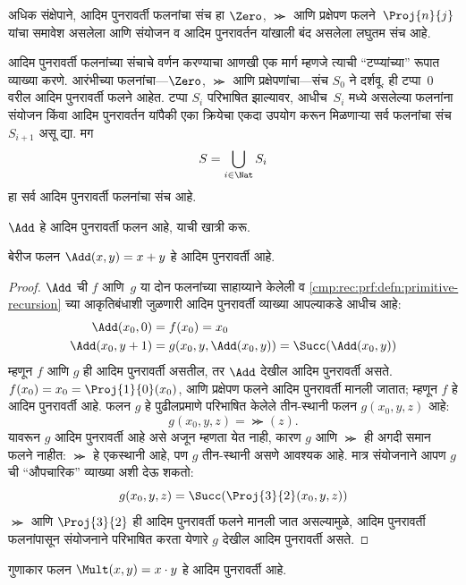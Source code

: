 \begin{explain}
अधिक संक्षेपाने, आदिम पुनरावर्ती फलनांचा संच हा $\Zero$, $\Succ$ आणि
प्रक्षेपण फलने~$\Proj{n}{j}$ यांचा समावेश असलेला आणि संयोजन व आदिम
पुनरावर्तन यांखाली बंद असलेला लघुतम संच आहे.

आदिम पुनरावर्ती फलनांच्या संचाचे वर्णन करण्याचा आणखी एक मार्ग म्हणजे
त्याची ``टप्प्यांच्या'' रूपात व्याख्या करणे. आरंभीच्या फलनांचा---$\Zero$,
$\Succ$ आणि प्रक्षेपणांचा---संच $S_0$ ने दर्शवू. ही टप्पा~$0$ वरील
आदिम पुनरावर्ती फलने आहेत. टप्पा $S_i$ परिभाषित झाल्यावर, आधीच~$S_i$
मध्ये असलेल्या फलनांना संयोजन किंवा आदिम पुनरावर्तन यांपैकी एका क्रियेचा
एकदा उपयोग करून मिळणाऱ्या सर्व फलनांचा संच $S_{i+1}$ असू द्या. मग
\[S = \bigcup_{i \in \Nat} S_i
\]
हा सर्व आदिम पुनरावर्ती फलनांचा संच आहे.
\end{explain}

$\Add$ हे आदिम पुनरावर्ती फलन आहे, याची खात्री करू.

\begin{prop}
  बेरीज फलन $\Add(x,y) = x+y$ हे आदिम पुनरावर्ती आहे.
\end{prop}

\begin{proof}
$\Add$ ची $f$ आणि~$g$ या दोन फलनांच्या साहाय्याने केलेली व
\ref{cmp:rec:prf:defn:primitive-recursion} च्या आकृतिबंधाशी जुळणारी आदिम
पुनरावर्ती व्याख्या आपल्याकडे आधीच आहे:
\begin{align*}
  \Add(x_0, 0) & = f(x_0) = x_0\\
  \Add(x_0, y+1) & = g(x_0, y, \Add(x_0, y)) =
  \Succ(\Add(x_0, y))
\end{align*}
म्हणून $f$ आणि $g$ ही आदिम पुनरावर्ती असतील, तर $\Add$ देखील आदिम
पुनरावर्ती असते. $f(x_0) = x_0 = \Proj{1}{0}(x_0)$, आणि प्रक्षेपण
फलने आदिम पुनरावर्ती मानली जातात; म्हणून $f$ हे आदिम पुनरावर्ती आहे.
फलन $g$ हे पुढीलप्रमाणे परिभाषित केलेले तीन-स्थानी फलन $g(x_0, y, z)$ आहे:
\[g(x_0, y, z) = \Succ(z).
\]
यावरून $g$ आदिम पुनरावर्ती आहे असे अजून म्हणता येत नाही, कारण $g$ आणि
$\Succ$ ही अगदी समान फलने नाहीत: $\Succ$ हे एकस्थानी आहे, पण $g$ तीन-स्थानी
असणे आवश्यक आहे. मात्र संयोजनाने आपण $g$ ची ``औपचारिक'' व्याख्या अशी
देऊ शकतो:
\[g(x_0, y, z) = \Succ(\Proj{3}{2}(x_0, y, z))
\]
$\Succ$ आणि $\Proj{3}{2}$ ही आदिम पुनरावर्ती फलने मानली जात असल्यामुळे,
आदिम पुनरावर्ती फलनांपासून संयोजनाने परिभाषित करता येणारे $g$ देखील आदिम
पुनरावर्ती असते.
\end{proof}

\begin{prop}
  \label{cmp:rec:prf:prop:mult-pr}
  गुणाकार फलन $\Mult(x,y) = x \cdot y$ हे आदिम पुनरावर्ती आहे.
\end{prop}

